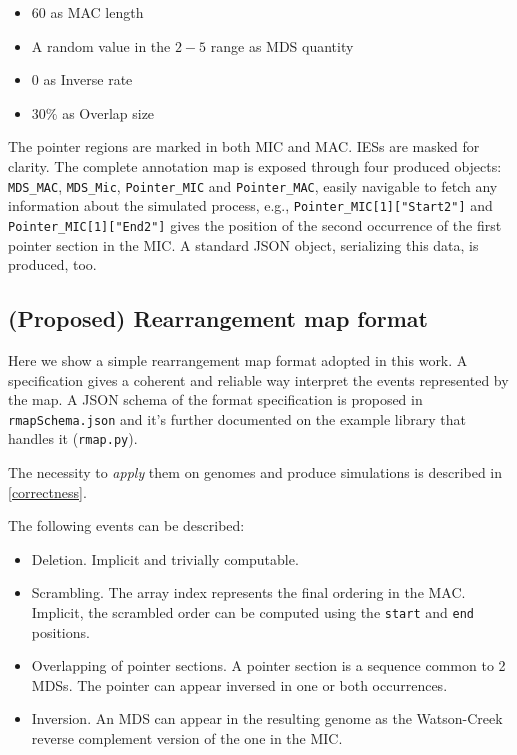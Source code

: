 \begin{itemize}
	\item $60$ as MAC length
	\item A random value in the $2-5$ range as MDS quantity
	\item $0$ as Inverse rate
	\item $30\%$ as Overlap size
\end{itemize}

The pointer regions are marked in both MIC and MAC. IESs are masked for clarity. The complete annotation map is exposed through four produced objects: \texttt{MDS\_MAC}, \texttt{MDS\_Mic}, \texttt{Pointer\_MIC} and \texttt{Pointer\_MAC}, easily navigable to fetch any information about the simulated process, e.g., \texttt{Pointer\_MIC[1]["Start2"]} and \texttt{Pointer\_MIC[1]["End2"]} gives the position of the second occurrence of the first pointer section in the MIC. A standard JSON object, serializing this data, is produced, too.

\subsection{(Proposed) Rearrangement map format}
\label{rmap}
Here we show a simple rearrangement map format adopted in this work. A specification gives a coherent and reliable way interpret the events represented by the map.
A JSON schema of the format specification is proposed in \texttt{rmapSchema.json} and it's further documented on the example library that handles it (\texttt{rmap.py}).

The necessity to \textit{apply} them on genomes and produce simulations is described in \ref{correctness}.

The following events can be described:

\begin{itemize}
	\item Deletion. Implicit and trivially computable.
	\item Scrambling. The array index represents the final ordering in the MAC. Implicit, the scrambled order can be computed using the \texttt{start} and \texttt{end} positions.
	\item Overlapping of pointer sections. A pointer section is a sequence common to 2 MDSs. The pointer can appear inversed in one or both occurrences.
	\item Inversion. An MDS can appear in the resulting genome as the Watson-Creek reverse complement version of the one in the MIC.
\end{itemize}

